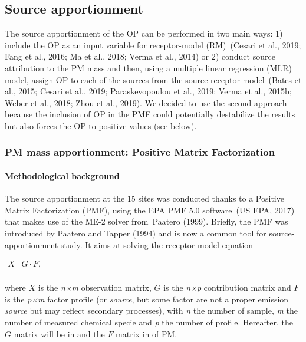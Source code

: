 \documentclass[
]{article}
\begin{document}
\hypertarget{source-apportionment}{%
\subsection{Source apportionment}\label{source-apportionment}}

The source apportionment of the OP can be performed in two main ways: 1)
include the OP as an input variable for receptor-model (RM)~(Cesari et
al., 2019; Fang et al., 2016; Ma et al., 2018; Verma et al., 2014) or 2)
conduct source attribution to the PM mass and then, using a multiple
linear regression (MLR) model, assign OP to each of the sources from the
source-receptor model~(Bates et al., 2015; Cesari et al., 2019;
Paraskevopoulou et al., 2019; Verma et al., 2015b; Weber et al., 2018;
Zhou et al., 2019). We decided to use the second approach because the
inclusion of OP in the PMF could potentially destabilize the results but
also forces the OP to positive values (see below).

\hypertarget{pm-mass-apportionment-positive-matrix-factorization}{%
\subsubsection{PM mass apportionment: Positive Matrix
Factorization}\label{pm-mass-apportionment-positive-matrix-factorization}}

\hypertarget{methodological-background}{%
\paragraph{Methodological background}\label{methodological-background}}

The source apportionment at the 15 sites was conducted thanks to a
Positive Matrix Factorization (PMF), using the EPA PMF 5.0 software~(US
EPA, 2017) that makes use of the ME-2 solver from~Paatero (1999).
Briefly, the PMF was introduced by Paatero and Tapper (1994) and is now
a common tool for source-apportionment study. It aims at solving the
receptor model equation

\(\begin{matrix}
X & G \cdot F, \\
\end{matrix}\)

where \(X\) is the \emph{n×m} observation matrix, \(G\) is the
\emph{n×p} contribution matrix and \(F\) is the \emph{p×m} factor
profile (or \emph{source}, but some factor are not a proper emission
\emph{source} but may reflect secondary processes), with \emph{n} the
number of sample, \emph{m} the number of measured chemical specie and
\emph{p} the number of profile. Hereafter, the \(G\) matrix will be in
and the \(F\) matrix in of PM.
\end{document}
